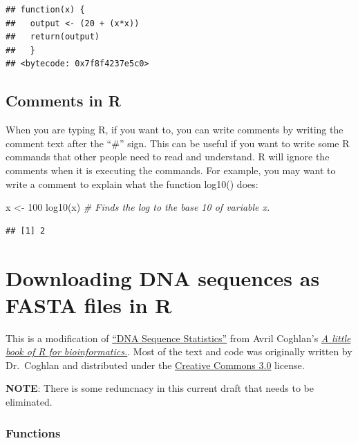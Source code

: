 \documentclass[
]{book}
\newenvironment{Shaded}{\begin{snugshade}}{\end{snugshade}}
\newcommand{\CommentTok}[1]{\textcolor[rgb]{0.56,0.35,0.01}{\textit{#1}}}
\newcommand{\DecValTok}[1]{\textcolor[rgb]{0.00,0.00,0.81}{#1}}
\newcommand{\FunctionTok}[1]{\textcolor[rgb]{0.00,0.00,0.00}{#1}}
\newcommand{\NormalTok}[1]{#1}
\newcommand{\OtherTok}[1]{\textcolor[rgb]{0.56,0.35,0.01}{#1}}
\begin{document}
\begin{verbatim}
## function(x) { 
##   output <- (20 + (x*x)) 
##   return(output)
##   }
## <bytecode: 0x7f8f4237e5c0>
\end{verbatim}

\hypertarget{comments-in-r}{%
\section{Comments in R}\label{comments-in-r}}

When you are typing R, if you want to, you can write comments by writing the comment text after the ``\#'' sign. This can be useful if you want to write some R commands that other people need to read and understand. R will ignore the comments when it is executing the commands. For example, you may want to write a comment to explain what the function log10() does:

\begin{Shaded}
\begin{Highlighting}[]
\NormalTok{x }\OtherTok{\textless{}{-}} \DecValTok{100}
\FunctionTok{log10}\NormalTok{(x) }\CommentTok{\# Finds the log to the base 10 of variable x.}
\end{Highlighting}
\end{Shaded}

\begin{verbatim}
## [1] 2
\end{verbatim}

\hypertarget{downloading-dna-sequences-as-fasta-files-in-r}{%
\chapter{Downloading DNA sequences as FASTA files in R}\label{downloading-dna-sequences-as-fasta-files-in-r}}

This is a modification of \href{https://a-little-book-of-r-for-bioinformatics.readthedocs.io/en/latest/src/chapter1.html}{``DNA Sequence Statistics''} from Avril Coghlan's \href{https://a-little-book-of-r-for-bioinformatics.readthedocs.io/en/latest/index.html}{\emph{A little book of R for bioinformatics.}}. Most of the text and code was originally written by Dr.~Coghlan and distributed under the \href{https://creativecommons.org/licenses/by/3.0/us/}{Creative Commons 3.0} license.

\textbf{NOTE}: There is some reduncnacy in this current draft that needs to be eliminated.

\hypertarget{functions-4}{%
\subsection{Functions}\label{functions-4}}
\end{document}
